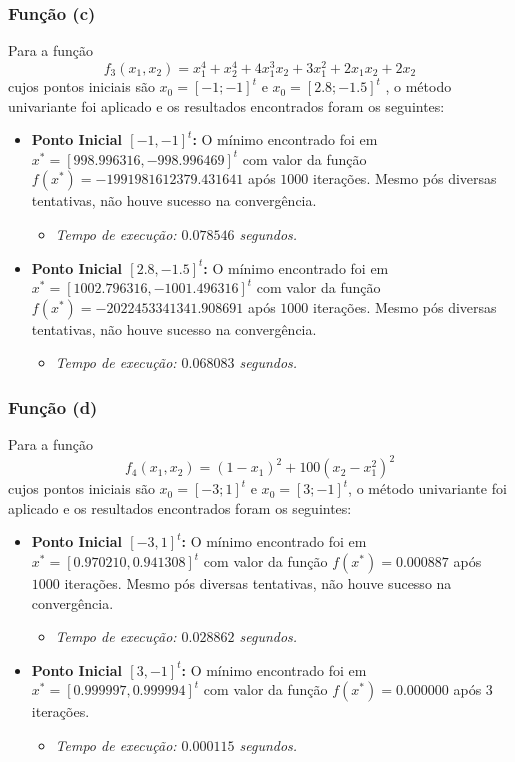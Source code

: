 \documentclass[a4paper, 12pt]{article}
\begin{document}
\subsubsection{Função (c)}

Para a função 
\[
f_3(x_1, x_2) = x_1^4 + x_2^4 + 4x_1^3x_2 + 3x_1^2 + 2x_1x_2 + 2x_2
\]
cujos pontos iniciais são $x_0 = [-1; -1]^t$ e $x_0 = [2.8; -1.5]^t$ , o método univariante foi aplicado e os resultados encontrados foram os seguintes:

\begin{itemize}
    \item \textbf{Ponto Inicial $[-1, -1]^t$:} O mínimo encontrado foi em $x^* = [998.996316, -998.996469]^t$ com valor da função $f(x^*) = -1991981612379.431641$ após $1000$ iterações. Mesmo pós diversas tentativas, não houve sucesso  na convergência. 
    \begin{itemize}
        \item \textit{Tempo de execução: $0.078546$ segundos.}
    \end{itemize}
    \item \textbf{Ponto Inicial $[2.8, -1.5]^t$:} O mínimo encontrado foi em $x^* = [1002.796316, -1001.496316]^t$ com valor da função $f(x^*) = -2022453341341.908691$ após $1000$ iterações. Mesmo pós diversas tentativas, não houve sucesso  na convergência. 
    \begin{itemize}
        \item \textit{Tempo de execução: $0.068083$ segundos.}
    \end{itemize}
\end{itemize}

\subsubsection{Função (d)}

Para a função 
\[
f_4(x_1, x_2) = (1 - x_1)^2 + 100(x_2 - x_1^2)^2
\]
cujos pontos iniciais são $x_0 = [-3; 1]^t$ e $x_0 = [3; -1]^t$, o método univariante foi aplicado e os resultados encontrados foram os seguintes:

\begin{itemize}
    \item \textbf{Ponto Inicial $[-3, 1]^t$:} O mínimo encontrado foi em $x^* = [0.970210, 0.941308]^t$ com valor da função $f(x^*) = 0.000887$ após $1000$ iterações. Mesmo pós diversas tentativas, não houve sucesso  na convergência. 

    \begin{itemize}
        \item \textit{Tempo de execução: $0.028862$ segundos.}
    \end{itemize}
    \item \textbf{Ponto Inicial $[3, -1]^t$:} O mínimo encontrado foi em $x^* = [0.999997, 0.999994]^t$ com valor da função $f(x^*) = 0.000000$ após $3$ iterações. 
    \begin{itemize}
        \item \textit{Tempo de execução: $0.000115$ segundos.}
    \end{itemize}
\end{itemize}
\end{document}
